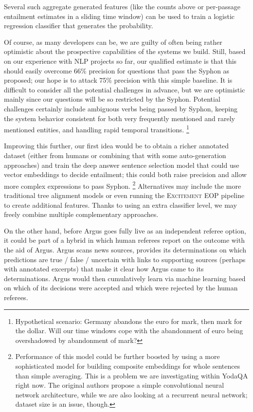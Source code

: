 \documentclass[11pt,a4paper]{article}
\begin{document}
Several such aggregate generated features (like the counts above or
per-passage entailment estimates in a sliding time window) can be used
to train a logistic regression classifier that generates the probability.

Of course, as many developers can be, we are guilty of often being rather optimistic about
the prospective capabilities of the systems we build.
Still, based on our experience with NLP projects so far, our qualified estimate
is that this should easily overcome 66\% precision for questions that
pass the Syphon as proposed; our hope is to attack 75\% precision with
this simple baseline.  It is difficult to consider all the potential
challenges in advance, but we are optimistic mainly since our questions
will be so restricted by the Syphon.  Potential challenges certainly include
ambiguous verbs being passed by Syphon, keeping the system behavior consistent
for both very frequently mentioned and rarely mentioned entities, and handling
rapid temporal transitions.%
\footnote{Hypothetical scenario: Germany abandons the euro for mark,
then mark for the dollar.  Will our time windows cope with the abandonment
of euro being overshadowed by abandonment of mark?}

Improving this further, our first idea would be to obtain a richer annotated
dataset (either from humans or combining that with some auto-generation
approaches) and train the deep answer sentence selection model \citep{Yu2014Deep}
that could use vector embeddings to decide entailment; this could both
raise precision and allow more complex expressions to pass Syphon.%
\footnote{Performance of this model could be further boosted by using
a more sophisticated model for building composite embeddings for whole sentences than simple averaging.
This is a problem we are investigating within YodaQA right now.
The original authors propose a simple convolutional neural network architecture,
while we are also looking at a recurrent neural network; dataset size is an issue, though.}
Alternatives may include the more traditional tree alignment models or even
running the \textsc{Excitement EOP} pipeline to create additional features.
Thanks to using an extra classifier level, we may freely
combine multiple complementary approaches.

On the other hand, before Argus goes fully live as an independent referee option, it could be part of a hybrid in
which human referees report on the outcome with the aid of Argus.  Argus scans news sources,
provides its determinations on which predictions are true / false / uncertain with links to
supporting sources (perhaps with annotated excerpts) that make it clear how Argus came to its
determinations. Argus would then cumulatively learn via machine learning based on which of its
decisions were accepted and which were rejected by the human referees.
\end{document}
